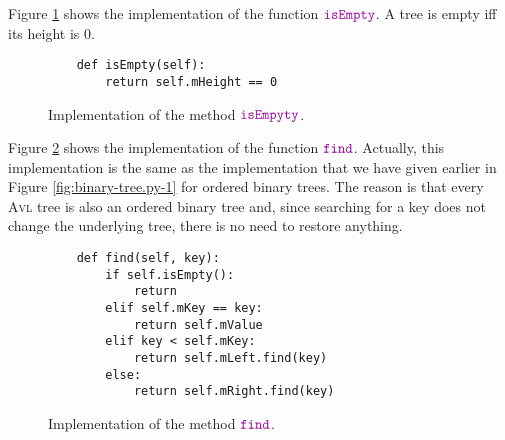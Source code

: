 Figure \ref{fig:avl-tree.ipython:isEmpty} shows the implementation of the function $\mytt{isEmpty}$.
A tree is empty iff its height is $0$.

\begin{figure}[!ht]
\centering
\begin{verbatim}
    def isEmpty(self):
        return self.mHeight == 0
\end{verbatim}
\vspace*{-0.3cm}
\caption{Implementation of the method $\mytt{isEmpyty}$.}
\label{fig:avl-tree.ipython:isEmpty}
\end{figure}
\pagebreak

Figure \ref{fig:avl-tree.ipython:find} shows the implementation of the function $\mytt{find}$.
Actually, this implementation is the same as the implementation that we have given earlier in Figure
\ref{fig:binary-tree.py-1} for ordered binary trees.  The reason is that every \textsc{Avl} tree is also an
ordered binary tree and, since searching for a key does not change the underlying tree, there is no need to
restore anything. 

\begin{figure}[!ht]
\centering
\begin{verbatim}
    def find(self, key):
        if self.isEmpty():
            return
        elif self.mKey == key:
            return self.mValue
        elif key < self.mKey:
            return self.mLeft.find(key)
        else:
            return self.mRight.find(key)
\end{verbatim}
\vspace*{-0.3cm}
\caption{Implementation of the method $\mytt{find}$.}
\label{fig:avl-tree.ipython:find}
\end{figure}

